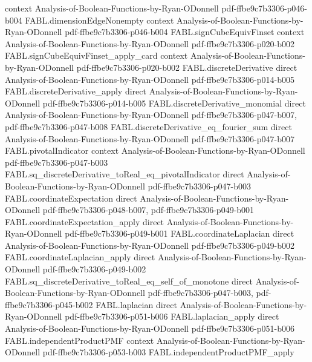 \begin{theorem}
  {context}
  {Analysis-of-Boolean-Functions-by-Ryan-ODonnell}
  {pdf-ffbe9c7b3306-p046-b004}
\proofstep
  {FABL.dimensionEdgeNonempty}
  {context}
  {Analysis-of-Boolean-Functions-by-Ryan-ODonnell}
  {pdf-ffbe9c7b3306-p046-b004}
\proofstep
  {FABL.signCubeEquivFinset}
  {context}
  {Analysis-of-Boolean-Functions-by-Ryan-ODonnell}
  {pdf-ffbe9c7b3306-p020-b002}
\proofstep
  {FABL.signCubeEquivFinset_apply_card}
  {context}
  {Analysis-of-Boolean-Functions-by-Ryan-ODonnell}
  {pdf-ffbe9c7b3306-p020-b002}
\proofstep
  {FABL.discreteDerivative}
  {direct}
  {Analysis-of-Boolean-Functions-by-Ryan-ODonnell}
  {pdf-ffbe9c7b3306-p014-b005}
\proofstep
  {FABL.discreteDerivative_apply}
  {direct}
  {Analysis-of-Boolean-Functions-by-Ryan-ODonnell}
  {pdf-ffbe9c7b3306-p014-b005}
\proofstep
  {FABL.discreteDerivative_monomial}
  {direct}
  {Analysis-of-Boolean-Functions-by-Ryan-ODonnell}
  {pdf-ffbe9c7b3306-p047-b007,
    pdf-ffbe9c7b3306-p047-b008}
\proofstep
  {FABL.discreteDerivative_eq_fourier_sum}
  {direct}
  {Analysis-of-Boolean-Functions-by-Ryan-ODonnell}
  {pdf-ffbe9c7b3306-p047-b007}
\proofstep
  {FABL.pivotalIndicator}
  {context}
  {Analysis-of-Boolean-Functions-by-Ryan-ODonnell}
  {pdf-ffbe9c7b3306-p047-b003}
\proofstep
  {FABL.sq_discreteDerivative_toReal_eq_pivotalIndicator}
  {direct}
  {Analysis-of-Boolean-Functions-by-Ryan-ODonnell}
  {pdf-ffbe9c7b3306-p047-b003}
\proofstep
  {FABL.coordinateExpectation}
  {direct}
  {Analysis-of-Boolean-Functions-by-Ryan-ODonnell}
  {pdf-ffbe9c7b3306-p048-b007,
    pdf-ffbe9c7b3306-p049-b001}
\proofstep
  {FABL.coordinateExpectation_apply}
  {direct}
  {Analysis-of-Boolean-Functions-by-Ryan-ODonnell}
  {pdf-ffbe9c7b3306-p049-b001}
\proofstep
  {FABL.coordinateLaplacian}
  {direct}
  {Analysis-of-Boolean-Functions-by-Ryan-ODonnell}
  {pdf-ffbe9c7b3306-p049-b002}
\proofstep
  {FABL.coordinateLaplacian_apply}
  {direct}
  {Analysis-of-Boolean-Functions-by-Ryan-ODonnell}
  {pdf-ffbe9c7b3306-p049-b002}
\proofstep
  {FABL.sq_discreteDerivative_toReal_eq_self_of_monotone}
  {direct}
  {Analysis-of-Boolean-Functions-by-Ryan-ODonnell}
  {pdf-ffbe9c7b3306-p047-b003,
    pdf-ffbe9c7b3306-p045-b002}
\proofstep
  {FABL.laplacian}
  {direct}
  {Analysis-of-Boolean-Functions-by-Ryan-ODonnell}
  {pdf-ffbe9c7b3306-p051-b006}
\proofstep
  {FABL.laplacian_apply}
  {direct}
  {Analysis-of-Boolean-Functions-by-Ryan-ODonnell}
  {pdf-ffbe9c7b3306-p051-b006}
\proofstep
  {FABL.independentProductPMF}
  {context}
  {Analysis-of-Boolean-Functions-by-Ryan-ODonnell}
  {pdf-ffbe9c7b3306-p053-b003}
\proofstep
  {FABL.independentProductPMF_apply}

\end{theorem}
